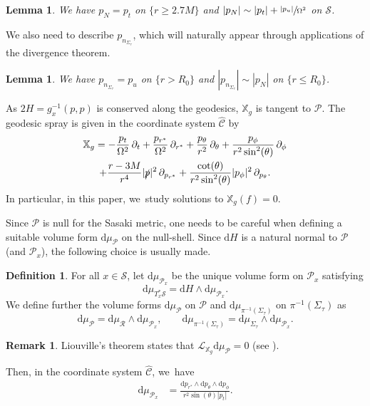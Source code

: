 \documentclass[JEP,XML,SOM,Unicode,published]{cedram}
\theoremstyle{plain}
\newtheorem{lemma}[proposition]{Lemma}
\theoremstyle{definition}
\newtheorem{definition}[proposition]{Definition}
\newtheorem{remark}[proposition]{Remark}
\newcommand\T{{\mathbb{X}}}
\newcommand\dr{{\mathrm{d}}}
\begin{document}
\begin{lemma}\label{LempN}
We have $p_N=p_t$ on $\{ r \geq 2.7M \}$ and $|p_N| \sim |p_t|+\sfrac{|p_u|}{\Omega^2} $ on $\mathcal{S}$.
\end{lemma}

We also need to describe $p_{n_{\Sigma_\tau}}$, which will naturally appear through applications of the divergence theorem.

\begin{lemma}\label{LempSig}
We have $p_{n_{\Sigma_\tau}}=p_u$ on $\{ r > R_0 \}$ and $|p_{n_{\Sigma_\tau}}| \sim |p_N|$ on $\{ r \leq R_0 \}$.
\end{lemma}

As $2H=g_x^{-1}(p,p)$ is conserved along the geodesics, $\T_g$ is tangent to $\mathcal{P}$. The geodesic spray is given in the coordinate system $\widehat{ \mathscr{C}}$ by
\begin{multline}\label{eq:defT}
\T_g = -\frac{p_t}{\Omega^2} \,\partial_t + \frac{p_{r^*}}{\Omega^2} \,\partial_{r^*}+\frac{p_{\theta}}{r^2} \,\partial_{\theta} + \frac{p_{\phi}}{r^2 \sin^2 (\theta)} \,\partial_{\phi} \\
+ \frac{r-3M}{r^4} |\slashed{p}|^2 \,\partial_{p_{r^*} }+\frac{\cot (\theta)}{r^2 \sin^2 (\theta)} |p_{\phi}|^2 \,\partial_{p_{\theta} }.
\end{multline}
In particular, in this paper, we~study solutions to $\T_g(f)=0$.

Since $\mathcal{P}$ is null for the Sasaki metric, one needs to be careful when defining a suitable volume form $\dr \mu_\mathcal{P}$ on the null-shell. Since $\dr H$ is a natural normal to $\mathcal{P}$ (and $\mathcal{P}_x$), the following choice is usually made.
\begin{definition}
For all $x \in \mathcal{S}$, let $\dr \mu_{\mathcal{P}_x}$ be the unique volume form on $\mathcal{P}_x$ satisfying
\[
\dr \mu_{T^*_x\mathcal{S}} = \dr H \wedge \dr \mu_{\mathcal{P}_x}.
\]
We define further the volume forms $\dr \mu_{\mathcal{P}}$ on $\mathcal{P}$ and $\dr \mu_{\pi^{-1}(\Sigma_\tau)}$ on $\pi^{-1}(\Sigma_\tau)$ as
\[
\dr \mu_{\mathcal{P}} =\dr \mu_{\mathcal{R}} \wedge \dr \mu_{\mathcal{P}_x},\qquad \dr \mu_{\pi^{-1}(\Sigma_\tau)} = \dr \mu_{\Sigma_\tau} \wedge \dr \mu_{\mathcal{P}_x}.
\]
\end{definition}
\begin{remark}\label{RkLiouvi}
Liouville's theorem states that $\mathcal{L}_{\T_g} \dr \mu_{\mathcal{P}}=0$ (see \cite[Th.\,2]{AGS}).
\end{remark}
Then, in the coordinate system $\widehat{\mathscr{C}}$, we~have
\begin{align*}
\dr \mu_{\mathcal{P}_x} & = \frac{\dr p_{r^*} \wedge \dr p_\theta \wedge \dr p_\phi}{r^2 \sin(\theta) |p_t|}.
\end{align*}
\end{document}
